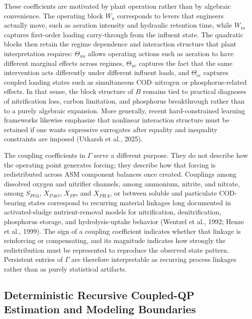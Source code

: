 \documentclass[a4paper,fleqn]{cas-sc}
\newenvironment{revblock}{}{}
\newenvironment{revblockr127}{}{}
\begin{document}
\begin{revblock}
These coefficients are motivated by plant operation rather than by algebraic convenience. The operating block $W_u$ corresponds to levers that engineers actually move, such as aeration intensity and hydraulic retention time, while $W_{in}$ captures first-order loading carry-through from the influent state. The quadratic blocks then retain the regime dependence and interaction structure that plant interpretation requires: $\Theta_{uu}$ allows operating actions such as aeration to have different marginal effects across regimes, $\Theta_{uc}$ captures the fact that the same intervention acts differently under different influent loads, and $\Theta_{cc}$ captures coupled loading states such as simultaneous COD--nitrogen or phosphorus-related effects. In that sense, the block structure of $B$ remains tied to practical diagnoses of nitrification loss, carbon limitation, and phosphorus breakthrough rather than to a purely algebraic expansion. More generally, recent hard-constrained learning frameworks likewise emphasize that nonlinear interaction structure must be retained if one wants expressive surrogates after equality and inequality constraints are imposed (Utkarsh et al., 2025).

The coupling coefficients in $\Gamma$ serve a different purpose. They do not describe how the operating point generates forcing; they describe how that forcing is redistributed across ASM component balances once created. Couplings among dissolved oxygen and nitrifier channels, among ammonium, nitrite, and nitrate, among $S_{PO4}$, $X_{PAO}$, $X_{PP}$, and $X_{PHA}$, or between soluble and particulate COD-bearing states correspond to recurring material linkages long documented in activated-sludge nutrient-removal models for nitrification, denitrification, phosphorus storage, and hydrolysis-uptake behavior (Wentzel et al., 1992; Henze et al., 1999). The sign of a coupling coefficient indicates whether that linkage is reinforcing or compensating, and its magnitude indicates how strongly the redistribution must be represented to reproduce the observed state pattern. Persistent entries of $\Gamma$ are therefore interpretable as recurring process linkages rather than as purely statistical artifacts.

\begin{revblockr127}
\subsection{Deterministic Recursive Coupled-QP Estimation and Modeling Boundaries}


\end{revblockr127}
\end{revblock}
\end{document}
